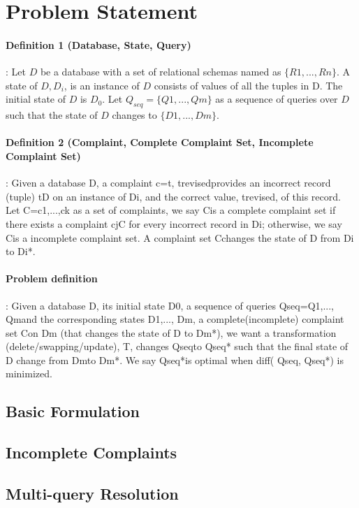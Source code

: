 \section{Problem Statement}



\paragraph{Definition 1 (Database, State, Query)}: Let $D$ be a database with a
set of relational schemas named as $\{R1, ..., Rn\}$. A state of $D, D_i$,
is an instance of $D$ consists of values of all the tuples in D. The
initial state of $D$ is $D_0$. Let $Q_{seq}=\{Q1,..., Qm\}$ as a sequence of
queries over $D$ such that the state of $D$ changes to $\{D1,..., Dm\}$.


\paragraph{Definition 2 (Complaint, Complete Complaint Set, Incomplete
Complaint Set)}:
Given a database D, a complaint c={t, trevised}provides an incorrect
record (tuple) tD on an instance of Di, and the correct value,
trevised, of this record. Let C={c1,...,ck} as a set of complaints,
we say Cis a complete complaint set if there exists a complaint
cjC for every incorrect record in Di; otherwise, we say Cis a
incomplete complaint set. A complaint set Cchanges the state of D
from Di to Di*.

\paragraph{Problem definition}: Given a database D, its initial
state D0, a sequence of queries Qseq={Q1,..., Qm}and the corresponding
states {D1,..., Dm}, a complete(incomplete) complaint set  Con Dm
(that changes the state of D to Dm*), we want a transformation
(delete/swapping/update), T, changes Qseqto Qseq* such that the
final state of D change from Dmto Dm*. We say  Qseq*is optimal when
diff( Qseq, Qseq*) is minimized.


\subsection{Basic Formulation}

\subsection{Incomplete Complaints}

\subsection{Multi-query Resolution}


